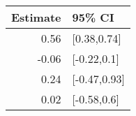 \begin{tabular}{rl}
  \hline
Estimate & 95\% CI \\ 
  \hline
0.56 & [0.38,0.74] \\ 
  -0.06 & [-0.22,0.1] \\ 
  0.24 & [-0.47,0.93] \\ 
  0.02 & [-0.58,0.6] \\ 
   \hline
\end{tabular}

